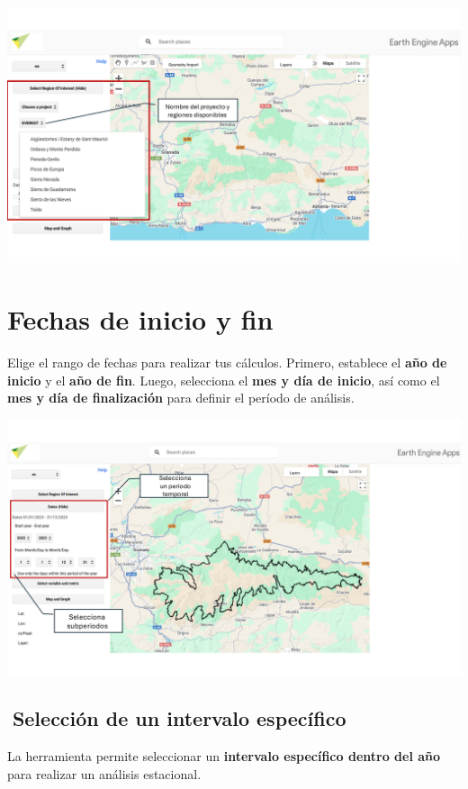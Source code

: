 \documentclass[
]{book}
\begin{document}
\includegraphics{assets/PROJECTS_es.png}

\chapter{Fechas de inicio y fin}\label{fechas}

Elige el rango de fechas para realizar tus cálculos. Primero, establece el \textbf{año de inicio} y el \textbf{año de fin}. Luego, selecciona el \textbf{mes y día de inicio}, así como el \textbf{mes y día de finalización} para definir el período de análisis.

\includegraphics{assets/dates_es.png}

\section{\texorpdfstring{\textbf{📆Selección de un intervalo específico}}{📆Selección de un intervalo específico}}\label{selecciuxf3n-de-un-intervalo-especuxedfico}

La herramienta permite seleccionar un \textbf{intervalo específico dentro del año} para realizar un análisis estacional.
\end{document}
